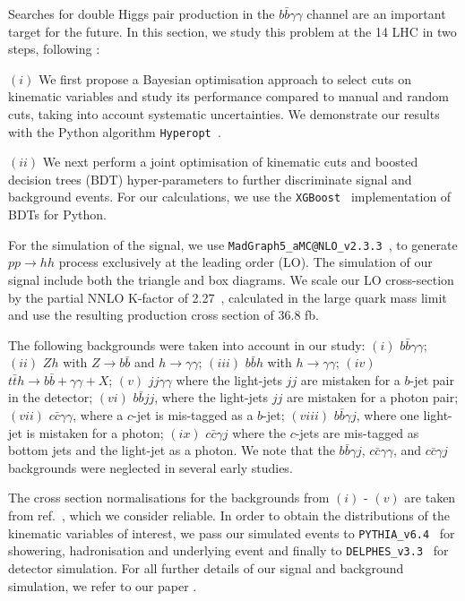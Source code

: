 Searches for double Higgs pair production in the $b\bar{b}\gamma\gamma$ channel are an important target for the future. In this section, we study this problem at the 14 \UTeV LHC in two steps, following \cite{Alves:2017ued}: 

$(i)$ We first propose a Bayesian optimisation approach to select cuts on kinematic variables and study its performance compared to manual and random cuts, taking into account systematic uncertainties. We demonstrate our results with the Python algorithm \texttt{Hyperopt }.

$(ii)$ We next perform a joint optimisation of kinematic cuts and boosted decision trees (BDT) hyper-parameters to further discriminate signal and background events.  For our calculations, we use the \texttt{XGBoost }  implementation of BDTs for Python. 


For the simulation of the signal, we use {\tt MadGraph5\_aMC@NLO\_v2.3.3}~\cite{Alwall:2011uj}, to generate $p p \rightarrow h h$ process exclusively at the leading order (LO). The simulation of our signal
include both the triangle and box diagrams. We scale our LO cross-section by the partial NNLO K-factor of 2.27~\cite{deFlorian:2013uza}, calculated in the large quark mass limit and use the resulting production cross section of 36.8 fb.

The following backgrounds were taken into account in our study: $(i)$ $b\bar{b}\gamma\gamma$; $(ii)$ $Zh$ with $Z \rightarrow b\bar{b}$ and $h \rightarrow \gamma\gamma$; $(iii)$ $b\bar{b}h$ with $h\to\gamma\gamma$; $(iv)$
$t\bar{t}h \rightarrow b\bar{b}+\gamma\gamma+X$; $(v)$ $jj\gamma\gamma$ where the light-jets $jj$ are mistaken for a $b$-jet pair in the detector; $(vi)$ $b\bar{b}jj$,  where the light-jets $jj$ are mistaken for a photon pair; $(vii)$ $c\bar{c}\gamma\gamma$, where a $c$-jet is mis-tagged as a $b$-jet; $(viii)$ $b\bar{b}\gamma j$, where one light-jet is mistaken for a photon; $(ix)$ $c\bar{c}\gamma j$ where the $c$-jets are mis-tagged as bottom jets and the light-jet as a photon. We note that the $b\bar{b}\gamma j$, $c\bar{c}\gamma\gamma$, and $c\bar{c}\gamma j$ backgrounds were neglected in several early studies. 
 
The cross section normalisations for the backgrounds from $(i)$ - $(v)$ are taken from ref.~\cite{Azatov:2015oxa}, which we consider reliable. In order to obtain the distributions of the kinematic variables of interest, we pass our simulated events to {\tt PYTHIA\_v6.4}~\cite{pythia} for showering, hadronisation and underlying event and finally to {\tt DELPHES\_v3.3}~\cite{deFavereau:2013fsa} for detector simulation. For all further details of our signal and background simulation, we refer to our paper \cite{Alves:2017ued}. 

